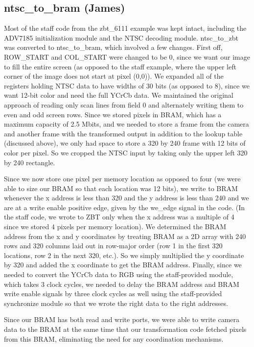 \documentclass{article}
\begin{document}
\subsection{ntsc\_to\_bram (James)}
Most of the staff code from the zbt\_6111 example was kept intact, including the ADV7185 initialization module and the NTSC decoding module.
ntsc\_to\_zbt was converted to ntsc\_to\_bram, which involved a few changes.
First off, ROW\_START and COL\_START were changed to be 0, since we want our image to fill the entire screen
(as opposed to the staff example, where the upper left corner of the image does not start at pixel (0,0)).
We expanded all of the registers holding NTSC data to have widths of 30 bits (as opposed to 8), since we want 12-bit color and need the full YCrCb data.
We maintained the original approach of reading only scan lines from field 0 and alternately writing them to even and odd screen rows.
Since we stored pixels in BRAM, which has a maximum capacity of 2.5 Mbits,
and we needed to store a frame from the camera and another frame with the transformed output in addition to the lookup table (discussed above),
we only had space to store a 320 by 240 frame with 12 bits of color per pixel.
So we cropped the NTSC input by taking only the upper left 320 by 240 rectangle.

Since we now store one pixel per memory location as opposed to four (we were able to size our BRAM so that each location was 12 bits),
we write to BRAM whenever the x address is less than 320 and the y address is less than 240 and we are at a write enable positive edge,
given by the we\_edge signal in the code.
(In the staff code, we wrote to ZBT only when the x address was a multiple of 4 since we stored 4 pixels per memory location).
We determined the BRAM address from the x and y coordinates by treating BRAM as a 2D array with 240 rows and 320 columns laid out in row-major order (row 1 in the first 320 locations, row 2 in the next 320, etc.).
So we simply multiplied the y coordinate by 320 and added the x coordinate to get the BRAM address.
Finally, since we needed to convert the YCrCb data to RGB using the staff-provided module, which takes 3 clock cycles,
we needed to delay the BRAM address and BRAM write enable signals by three clock cycles as well using the staff-provided synchronize module so that we wrote the right data to the right addresses.

Since our BRAM has both read and write ports, we were able to write camera data to the BRAM at the same time that our transformation code fetched pixels from this BRAM,
eliminating the need for any coordination mechanisms.
\end{document}
